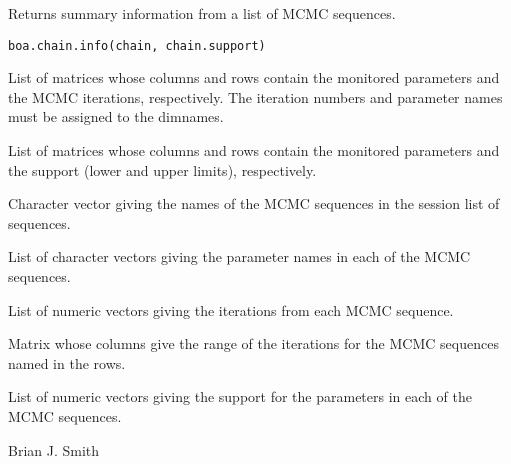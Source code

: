 \begin{Description}\relax
Returns summary information from a list of MCMC sequences.
\end{Description}
\begin{Usage}
\begin{verbatim}
boa.chain.info(chain, chain.support)
\end{verbatim}
\end{Usage}
\begin{Arguments}
\begin{ldescription}
\item[\code{chain}] List of matrices whose columns and rows contain the monitored
parameters and the MCMC iterations, respectively. The iteration numbers and
parameter names must be assigned to the dimnames.
\item[\code{chain.support}] List of matrices whose columns and rows contain the
monitored parameters and the support (lower and upper limits), respectively.
\end{ldescription}
\end{Arguments}
\begin{Value}
\begin{ldescription}
\item[\code{lnames}] Character vector giving the names of the MCMC sequences in the
session list of sequences.
\item[\code{pnames}] List of character vectors giving the parameter names in each
of the MCMC sequences.
\item[\code{iter}] List of numeric vectors giving the iterations from each MCMC
sequence.
\item[\code{iter.range}] Matrix whose columns give the range of the iterations for
the MCMC sequences named in the rows.
\item[\code{support}] List of numeric vectors giving the support for the parameters
in each of the MCMC sequences.
\end{ldescription}
\end{Value}
\begin{Author}\relax
Brian J. Smith
\end{Author}
\begin{SeeAlso}\relax
{}
\end{SeeAlso}


